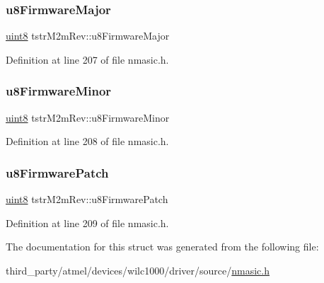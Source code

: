 \subsubsection{\texorpdfstring{u8\+Firmware\+Major}{u8FirmwareMajor}}
{\footnotesize\ttfamily \hyperlink{group__DataT_ga4df709a77647e870bbf1d955b8edc9a6}{uint8} tstr\+M2m\+Rev\+::u8\+Firmware\+Major}



Definition at line 207 of file nmasic.\+h.

\mbox{\label{structtstrM2mRev_a9647011c59d10a38acd1ab70c26353aa}} 
\subsubsection{\texorpdfstring{u8\+Firmware\+Minor}{u8FirmwareMinor}}
{\footnotesize\ttfamily \hyperlink{group__DataT_ga4df709a77647e870bbf1d955b8edc9a6}{uint8} tstr\+M2m\+Rev\+::u8\+Firmware\+Minor}



Definition at line 208 of file nmasic.\+h.

\mbox{\label{structtstrM2mRev_aa8be74043435e22e858ffb916abd83c2}} 
\subsubsection{\texorpdfstring{u8\+Firmware\+Patch}{u8FirmwarePatch}}
{\footnotesize\ttfamily \hyperlink{group__DataT_ga4df709a77647e870bbf1d955b8edc9a6}{uint8} tstr\+M2m\+Rev\+::u8\+Firmware\+Patch}



Definition at line 209 of file nmasic.\+h.



The documentation for this struct was generated from the following file\+:\begin{DoxyCompactItemize}
\item 
third\+\_\+party/atmel/devices/wilc1000/driver/source/\hyperlink{nmasic_8h}{nmasic.\+h}\end{DoxyCompactItemize}
